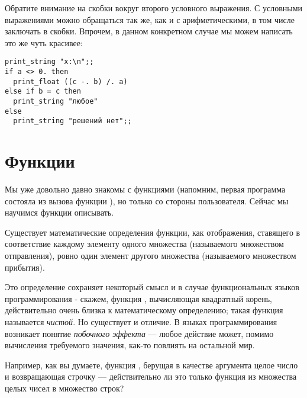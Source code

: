 Обратите внимание на скобки вокруг второго условного выражения. 
С условными выражениями можно обращаться так же, как и с арифметическими, 
в том числе заключать в скобки. 
Впрочем, в данном конкретном случае мы можем написать
это же чуть красивее:

\begin{verbatim}
print_string "x:\n";;
if a <> 0. then 
  print_float ((c -. b) /. a)
else if b = c then
  print_string "любое"
else
  print_string "решений нет";;
\end{verbatim}

%

\section{Функции}

Мы уже довольно давно знакомы с функциями (напомним, первая программа 
состояла из вызова функции ), но только со стороны
пользователя. Сейчас мы научимся функции описывать.

Существует математические определения функции, как отображения, ставящего
в соответствие каждому элементу одного множества (называемого множеством
отправления), ровно один элемент другого множества (называемого множеством
прибытия).

Это определение сохраняет некоторый смысл и в случае функциональных 
языков программирования - скажем, функция , вычисляющая квадратный 
корень, действительно очень близка к математическому определению; 
такая функция называется \emph{чистой}. Но существует и отличие. 
В языках программирования возникает понятие \emph{побочного эффекта} ---
любое действие может, помимо 
вычисления требуемого значения, как-то повлиять на остальной мир.

Например, как вы думаете, функция , берущая в 
качестве аргумента целое число и возвращающая строчку 
 --- действительно ли это только функция из 
множества целых чисел в множество строк? 

